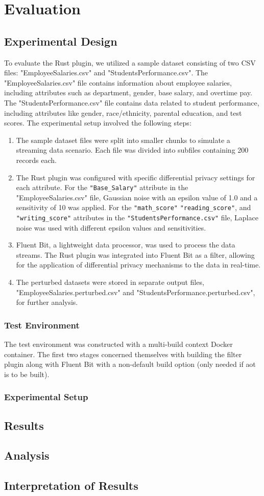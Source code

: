 \chapter{Evaluation\label{chap:evaluation}}
\section{Experimental Design}
To evaluate the Rust plugin, we utilized a sample dataset consisting of two CSV files: "EmployeeSalaries.csv" and "StudentsPerformance.csv". The "EmployeeSalaries.csv" file contains information about employee salaries, including attributes such as department, gender, base salary, and overtime pay. The "StudentsPerformance.csv" file contains data related to student performance, including attributes like gender, race/ethnicity, parental education, and test scores.
The experimental setup involved the following steps:

\begin{enumerate}
    \item The sample dataset files were split into smaller chunks to simulate a streaming data scenario. Each file was divided into subfiles containing 200 records each.
    \item The Rust plugin was configured with specific differential privacy settings for each attribute. For the \texttt{"Base\_Salary"} attribute in the "EmployeeSalaries.csv" file, Gaussian noise with an epsilon value of 1.0 and a sensitivity of 10 was applied. For the \texttt{"math\_score"} \texttt{"reading\_score"}, and \texttt{"writing\_score"} attributes in the \texttt{"StudentsPerformance.csv"} file, Laplace noise was used with different epsilon values and sensitivities.
    \item Fluent Bit, a lightweight data processor, was used to process the data streams. The Rust plugin was integrated into Fluent Bit as a filter, allowing for the application of differential privacy mechanisms to the data in real-time.
    \item The perturbed datasets were stored in separate output files, "EmployeeSalaries.perturbed.csv" and "StudentsPerformance.perturbed.csv", for further analysis.
\end{enumerate}
\subsection{Test Environment}
The test environment was constructed with a multi-build context Docker container. The first two stages concerned themselves with building the filter plugin along with Fluent Bit with a non-default build option (only needed if \acrshort{aot} is to be built).
\subsection{Experimental Setup}
\section{Results}
\section{Analysis}
\section{Interpretation of Results}